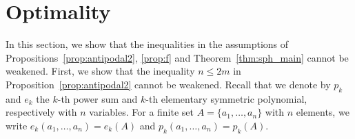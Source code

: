 \documentclass[11pt]{amsart}
\theoremstyle{definition}
\begin{document}
\section{Optimality}\label{sec:5}

In this section, we show that the inequalities in the assumptions of
Propositions~\ref{prop:antipodal2}, \ref{prop:f} and
Theorem~\ref{thm:sph_main} cannot be weakened.
First, we show that the inequality $n\le2m$ in 
Proposition~\ref{prop:antipodal2} cannot be weakened.
Recall that we denote by \( p_k \) and \( e_k \) 
the \( k \)-th power sum and $k$-th elementary symmetric polynomial, respectively
with $n$ variables.
For a finite set $A=\{a_1,\dots,a_n\}$ with $n$ elements, we write
$e_k(a_1,\dots,a_n)=e_k(A)$ and $p_k(a_1,\dots,a_n)=p_k(A)$.
\end{document}
